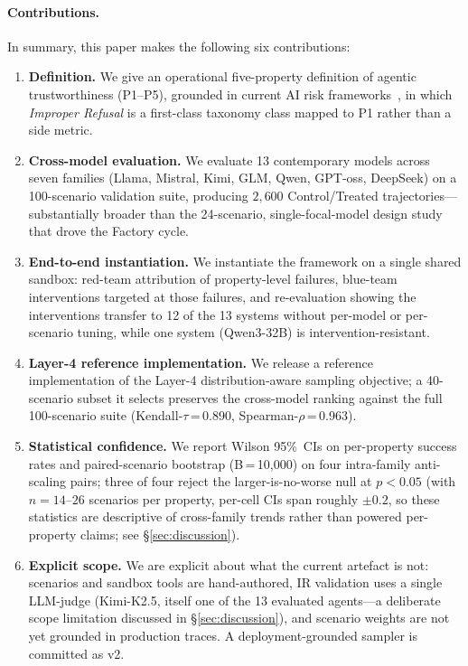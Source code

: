 \paragraph{Contributions.}
In summary, this paper makes the following six contributions:
\begin{enumerate}[leftmargin=*,label=(C\arabic*)]
\item \textbf{Definition.} We give an operational five-property definition of agentic trustworthiness (P1--P5), grounded in current AI risk frameworks~\cite{nist2023airmf,eu2024aiact}, in which \emph{Improper Refusal} is a first-class taxonomy class mapped to P1 rather than a side metric.
\item \textbf{Cross-model evaluation.} We evaluate 13 contemporary models across seven families (Llama, Mistral, Kimi, GLM, Qwen, GPT-oss, DeepSeek) on a 100-scenario validation suite, producing $2{,}600$ Control/Treated trajectories---substantially broader than the 24-scenario, single-focal-model design study that drove the Factory cycle.
\item \textbf{End-to-end instantiation.} We instantiate the framework on a single shared sandbox: red-team attribution of property-level failures, blue-team interventions targeted at those failures, and re-evaluation showing the interventions transfer to 12 of the 13 systems without per-model or per-scenario tuning, while one system (Qwen3-32B) is intervention-resistant.
\item \textbf{Layer-4 reference implementation.} We release a reference implementation of the Layer-4 distribution-aware sampling objective; a 40-scenario subset it selects preserves the cross-model ranking against the full 100-scenario suite (Kendall-$\tau$\,=\,0.890, Spearman-$\rho$\,=\,0.963).
\item \textbf{Statistical confidence.} We report Wilson 95\%~CIs on per-property success rates and paired-scenario bootstrap (B\,=\,10{,}000) on four intra-family anti-scaling pairs; three of four reject the larger-is-no-worse null at $p<0.05$ (with $n{=}14$--$26$ scenarios per property, per-cell CIs span roughly $\pm 0.2$, so these statistics are descriptive of cross-family trends rather than powered per-property claims; see \S\ref{sec:discussion}).
\item \textbf{Explicit scope.} We are explicit about what the current artefact is not: scenarios and sandbox tools are hand-authored, IR validation uses a single LLM-judge (Kimi-K2.5, itself one of the 13 evaluated agents---a deliberate scope limitation discussed in \S\ref{sec:discussion}), and scenario weights are not yet grounded in production traces. A deployment-grounded sampler is committed as v2.
\end{enumerate}
